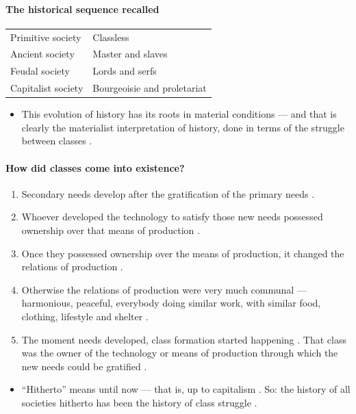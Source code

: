 \paragraph{The historical sequence recalled}
\begin{table}[h!]
\centering
\begin{tabularx}{\textwidth}{lY}
\toprule
{}
 &  \\
\midrule
Primitive society & Classless \\
Ancient society & Master and slaves \\
Feudal society & Lords and serfs \\
Capitalist society & Bourgeoisie and proletariat \\
\bottomrule
\end{tabularx}
\end{table}

\begin{itemize}
    \item This evolution of history has its roots in material conditions --- and that is clearly the materialist interpretation of history, done in terms of the struggle between classes .
\end{itemize}

\paragraph{How did classes come into existence?}
\begin{enumerate}
    \item Secondary needs develop after the gratification of the primary needs .
    \item Whoever developed the technology to satisfy those new needs possessed ownership over that means of production .
    \item Once they possessed ownership over the means of production, it changed the relations of production .
    \item Otherwise the relations of production were very much communal --- harmonious, peaceful, everybody doing similar work, with similar food, clothing, lifestyle and shelter .
    \item The moment needs developed, class formation started happening . That class was the owner of the technology or means of production through which the new needs could be gratified .
\end{enumerate}
\begin{itemize}
    \item ``Hitherto'' means until now --- that is, up to capitalism . So: the history of all societies hitherto has been the history of class struggle .
\end{itemize}


